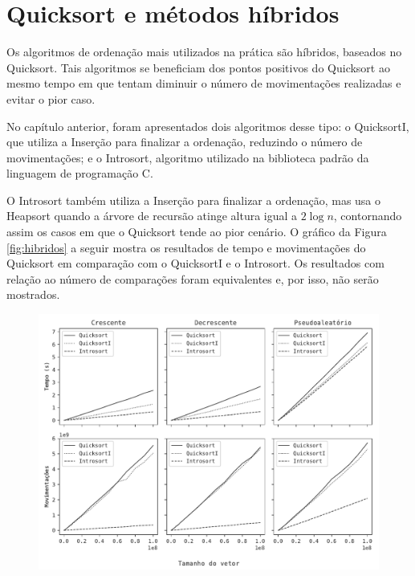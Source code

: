\section{Quicksort e métodos híbridos}
Os algoritmos de ordenação mais utilizados na prática são híbridos, baseados no Quicksort. Tais algoritmos se beneficiam dos pontos positivos do Quicksort ao mesmo tempo em que tentam diminuir o número de movimentações realizadas e evitar o pior caso.

No capítulo anterior, foram apresentados dois algoritmos desse tipo: o QuicksortI, que utiliza a Inserção para finalizar a ordenação, reduzindo o número de movimentações; e o Introsort, algoritmo utilizado na biblioteca padrão da linguagem de programação C\raisebox{0.4ex}{\text{\tiny{++}}}.

O Introsort também utiliza a Inserção para finalizar a ordenação, mas usa o Heapsort quando a árvore de recursão atinge altura igual a $2\log n$, contornando assim os casos em que o Quicksort tende ao pior cenário. O gráfico da Figura \ref{fig:hibridos} a seguir mostra os resultados de tempo e movimentações do Quicksort em comparação com o QuicksortI e o Introsort. Os resultados com relação ao número de comparações foram equivalentes e, por isso, não serão mostrados.

\begin{figure}[H]
\centering
\includegraphics[scale=0.787]{figuras/pdf/hibridos.pdf}
\end{figure}

